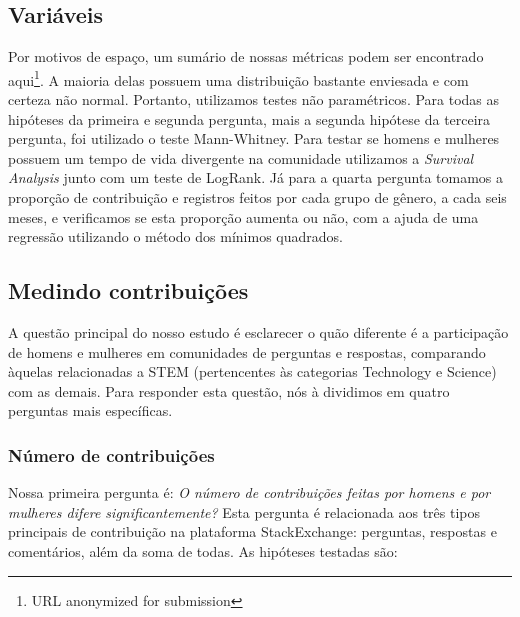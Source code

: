 

\subsection{Variáveis}

Por motivos de espaço, um sumário de nossas métricas podem ser encontrado aqui\footnote{URL anonymized for submission}. A maioria delas possuem uma distribuição bastante enviesada e com certeza não normal. Portanto, utilizamos testes não paramétricos. Para todas as hipóteses da primeira e segunda pergunta, mais a segunda hipótese da terceira pergunta, foi utilizado o teste Mann-Whitney. Para testar se homens e mulheres possuem um tempo de vida divergente na comunidade utilizamos a \textit{Survival Analysis} junto com um teste de LogRank. Já para a quarta pergunta tomamos a proporção de contribuição e registros feitos por cada grupo de gênero, a cada seis meses, e verificamos se esta proporção aumenta ou não, com a ajuda de uma regressão utilizando o método dos mínimos quadrados.

\subsection{Medindo contribuições}

A questão principal do nosso estudo é esclarecer o quão diferente é a participação de homens e mulheres em comunidades de perguntas e respostas, comparando àquelas relacionadas a STEM (pertencentes às categorias Technology e Science) com as demais. Para responder esta questão, nós à dividimos em quatro perguntas mais específicas.

\subsubsection{Número de contribuições}

Nossa primeira pergunta é: \textit{O número de contribuições feitas por homens e por mulheres difere significantemente?} Esta pergunta é relacionada aos três tipos principais de contribuição na plataforma StackExchange: perguntas, respostas e comentários, além da soma de todas. As hipóteses testadas são:

